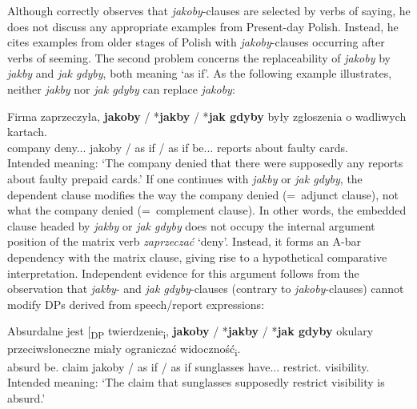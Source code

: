 \documentclass[output=paper]{langsci/langscibook}
\begin{document}
\noindent Although \textcite{Taborek2008} correctly observes that \emph{jakoby}-clauses are selected by verbs of saying, he does not discuss any appropriate examples from Present-day Polish. Instead, he cites examples from older stages of Polish with  \emph{jakoby}-clauses occurring after verbs of seeming. The second problem concerns the replaceability of \emph{jakoby} by  \emph{jakby} and \emph{jak gdyby}, both meaning `as if'. As the following example illustrates, neither \emph{jakby} nor \emph{jak gdyby} can replace \emph{jakoby}:\pagebreak

\ea \gll Firma zaprzeczyła, \textbf{jakoby} {\normalfont/} *\textbf{jakby} {\normalfont/} *\textbf{jak gdyby} były zgłoszenia o wadliwych kartach. \label{Taborek2} \\
		company deny.{\lptcp}.{\sg}.{\fem} jakoby / {as if} / {as if} be.{\lptcp}.{\nvir}.{\pl} reports about faulty cards.{\LOC} \\
\glt	Intended meaning: `The company denied that there were supposedly any reports about faulty prepaid cards.'
\z
If one continues  with \emph{jakby} or \emph{jak gdyby}, the dependent clause modifies the way the company denied (=~adjunct clause), not what the company denied (=~complement clause). In other words, the embedded clause headed by \emph{jakby} or \emph{jak gdyby} does not occupy the internal argument position of the matrix verb \emph{zaprzeczać} `deny'. Instead, it forms an A-bar dependency with the matrix clause, giving rise to a hypothetical comparative interpretation. Independent evidence for this argument follows from the observation that \emph{jakby}- and \emph{jak gdyby}-clauses (contrary to \emph{jakoby}-clauses) cannot modify DPs derived from speech\slash report expressions:

\ea \gll Absurdalne jest {\normalfont[\textsubscript{DP}} twierdzenie{\cb}\textsubscript{i}, {\ob}\textbf{jakoby} {\normalfont/} *\textbf{jakby} {\normalfont/} *\textbf{jak gdyby}  {okulary przeciwsłoneczne} miały ograniczać widoczność{\cb}\textsubscript{i}. \\
		absurd be.{\thirdperson}{\sg} {} claim jakoby / {as if} / {as if} sunglasses have.{\lptcp}.{\nvir}.{\pl}  restrict.{\infv} visibility.{\acc} \\
\glt	Intended meaning: `The claim that  sunglasses supposedly restrict visibility is absurd.'
\z
\end{document}
